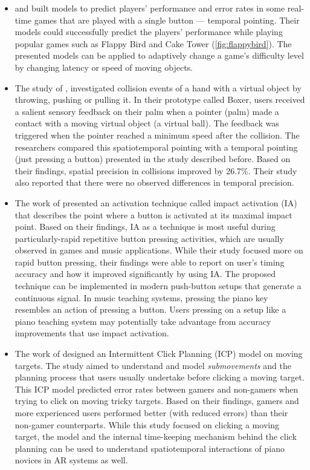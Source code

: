 \documentclass[manuscript,screen]{acmart}
\begin{document}
\begin{itemize}
\item \citet{lee2016modelling} and \citet{lee2018moving} built models to predict players' performance and error rates in some real-time games that are played with a single button — temporal pointing. Their models could successfully predict the players' performance while playing popular games such as Flappy Bird and Cake Tower (\ref{fig:flappybird}). The presented models can be applied to adaptively change a game's difficulty level by changing latency or speed of moving objects. 
\item The study of \citet{lee2017boxer}, investigated collision events of a hand with a virtual object by throwing, pushing or pulling it. In their prototype called Boxer, users received a salient sensory feedback on their palm when a pointer (palm) made a contact with a moving virtual object (a virtual ball). The feedback was triggered when the pointer reached a minimum speed after the collision. The researchers compared this spatiotemporal pointing with a temporal pointing (just pressing a button) presented in the study described before. Based on their findings, spatial precision in collisions improved by 26.7\%. Their study also reported that there were no observed differences in temporal precision.
\item The work of \citet{kim2018impact} presented an activation technique called impact activation (IA) that describes the point where a button is activated at its maximal impact point. Based on their findings, IA as a technique is most useful during particularly-rapid repetitive button pressing activities, which are usually observed in games and music applications. While their study focused more on rapid button pressing, their findings were able to report on user's timing accuracy and how it improved significantly by using IA. The proposed technique can be implemented in modern push-button setups that generate a continuous signal. In music teaching systems, pressing the piano key resembles an action of pressing a button. Users pressing on a setup like a piano teaching system may potentially take advantage from accuracy improvements that use impact activation.
\item The work of \citet{park2020intermittent} designed an Intermittent Click Planning (ICP) model on moving targets. The study aimed to understand and model \textit{submovements} and the planning process that users usually undertake before clicking a moving target. This ICP model predicted error rates between gamers and non-gamers when trying to click on moving tricky targets. Based on their findings, gamers and more experienced users performed better (with reduced errors) than their non-gamer counterparts. While this study focused on clicking a moving target, the model and the internal time-keeping mechanism behind the click planning can be used to understand spatiotemporal interactions of piano novices in AR systems as well. 
\end{itemize}
\end{document}
